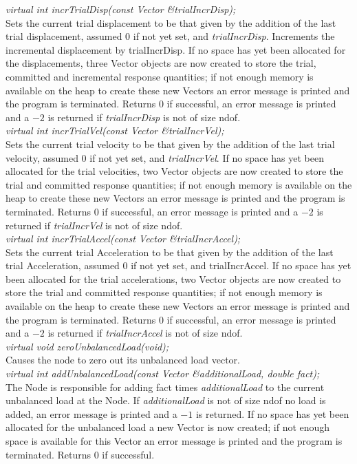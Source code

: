 {\em virtual int incrTrialDisp(const Vector \&trialIncrDisp);} \\
Sets the current trial displacement to be that given by the addition
of the last trial displacement, assumed $0$ if not yet set, and {\em
trialIncrDisp}. Increments the incremental displacement by \p trialIncrDisp.
If no space has yet been allocated for the displacements, three Vector objects 
are now created to store
the trial, committed and incremental response quantities; if not enough memory 
is available on the heap to create these new Vectors an error message
is printed and the program is terminated. Returns $0$ if successful,
an error message is printed and a $-2$ is returned if {\em
trialIncrDisp} is not of size \p ndof. \\

{\em virtual int incrTrialVel(const Vector \&trialIncrVel);} \\
Sets the current trial velocity to be that given by the addition
of the last trial velocity, assumed $0$ if not yet set, and {\em
trialIncrVel}. If no space has yet been allocated for
the trial velocities, two Vector objects are now created to store
the trial and committed response quantities; if not enough memory 
is available on the heap to create these new Vectors an error message
is printed and the program is terminated. Returns $0$ if successful,
an error message is printed and a $-2$ is returned if {\em
trialIncrVel} is not of size \p ndof. \\

{\em virtual int incrTrialAccel(const Vector \&trialIncrAccel);} \\
Sets the current trial Acceleration to be that given by the addition
of the last trial Acceleration, assumed $0$ if not yet set, and
\p trialIncrAccel.  If no space has yet been allocated for
the trial accelerations, two Vector objects are now created to store
the trial and committed response quantities; if not enough memory 
is available on the heap to create these new Vectors an error message
is printed and the program is terminated. Returns $0$ if successful,
an error message is printed and a $-2$ is returned if {\em
trialIncrAccel} is not of size \p ndof. \\

{\em virtual void zeroUnbalancedLoad(void);} \\
Causes the node to zero out its unbalanced load vector. \\

{\em virtual int addUnbalancedLoad(const Vector \&additionalLoad, double fact);} \\
The Node is responsible for adding \p fact times {\em
additionalLoad} to the current unbalanced load at the Node. If {\em
additionalLoad} is not of size \p ndof no load is added, an error
message is printed and a $-1$ is returned. If no space has yet been
allocated for the unbalanced load a new Vector is now created;  
if not enough space is available for this Vector an error message is
printed and the program is terminated. Returns $0$ if successful.  \\ 

